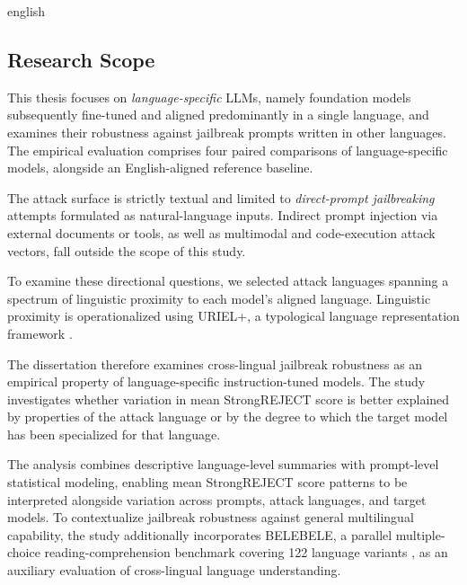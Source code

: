 \begin{otherlanguage*}{english}
\subsection{Research Scope}

This thesis focuses on \textit{language-specific} LLMs, namely foundation models subsequently fine-tuned and aligned predominantly in a single language, and examines their robustness against jailbreak prompts written in other languages. The empirical evaluation comprises four paired comparisons of language-specific models, alongside an English-aligned reference baseline.

The attack surface is strictly textual and limited to \emph{direct-prompt jailbreaking} attempts formulated as natural-language inputs. Indirect prompt injection via external documents or tools, as well as multimodal and code-execution attack vectors, fall outside the scope of this study.

To examine these directional questions, we selected attack languages spanning a spectrum of linguistic proximity to each model's aligned language. Linguistic proximity is operationalized using URIEL+, a typological language representation framework \cite{khan-etal-2025-uriel}.

The dissertation therefore examines cross-lingual jailbreak robustness as an empirical property of language-specific instruction-tuned models. The study investigates whether variation in mean StrongREJECT score is better explained by properties of the attack language or by the degree to which the target model has been specialized for that language.

The analysis combines descriptive language-level summaries with prompt-level statistical modeling, enabling mean StrongREJECT score patterns to be interpreted alongside variation across prompts, attack languages, and target models. To contextualize jailbreak robustness against general multilingual capability, the study additionally incorporates BELEBELE, a parallel multiple-choice reading-comprehension benchmark covering 122 language variants \cite{bandarkar-etal-2024-belebele}, as an auxiliary evaluation of cross-lingual language understanding.


\end{otherlanguage*}
